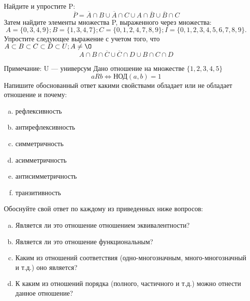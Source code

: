 \documentclass[10pt]{exam}
\begin{document}
\begin{questions}
\question
Найдите и упростите P:
\begin{equation*}
\overline{P} = \overline{A} \cap B \cup \overline{A} \cap C \cup A \cap \overline{B} \cup \overline{B} \cap C
\end{equation*}
Затем найдите элементы множества P, выраженного через множества:
\begin{equation*}
A = \{0, 3, 4, 9\}; 
B = \{1, 3, 4, 7\};
C = \{0, 1, 2, 4, 7, 8, 9\};
I = \{0, 1, 2, 3, 4, 5, 6, 7, 8, 9\}.
\end{equation*}\question
Упростите следующее выражение с учетом того, что $A\subset B \subset C \subset D \subset U; A \neq \O$
\begin{equation*}
A \cap B  \cap \overline{C} \cup \overline{C} \cap D \cup B \cap C \cap D
\end{equation*}

Примечание: U — универсум\question
Дано отношение на множестве $\{1, 2, 3, 4, 5\}$ 
\begin{equation*}
aRb \iff  \text{НОД}(a,b) =1
\end{equation*}
Напишите обоснованный ответ какими свойствами обладает или не обладает отношение и почему:   
\begin{enumerate} [a)]\setcounter{enumi}{0}
\item рефлексивность
\item антирефлексивность
\item симметричность
\item асимметричность
\item антисимметричность
\item транзитивность
\end{enumerate}

Обоснуйте свой ответ по каждому из приведенных ниже вопросов:
\begin{enumerate} [a)]\setcounter{enumi}{0}
    \item Является ли это отношение отношением эквивалентности?
    \item Является ли это отношение функциональным?
    \item Каким из отношений соответствия (одно-многозначным, много-многозначный и т.д.) оно является?
    \item К каким из отношений порядка (полного, частичного и т.д.) можно отнести данное отношение?
\end{enumerate}



\end{questions}
\end{document}
